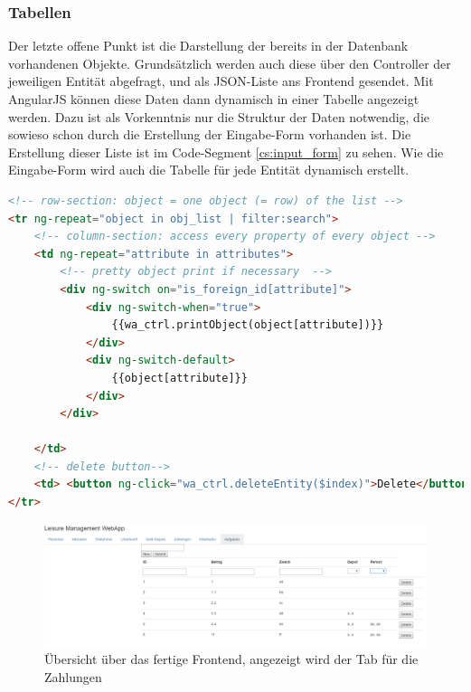 \subsubsection{Tabellen}

Der letzte offene Punkt ist die Darstellung der bereits in der Datenbank vorhandenen Objekte. Grundsätzlich werden auch diese über den Controller der jeweiligen Entität abgefragt, und als JSON-Liste ans Frontend gesendet. Mit AngularJS können diese Daten dann dynamisch in einer Tabelle angezeigt werden. Dazu ist als Vorkenntnis nur die Struktur der Daten notwendig, die sowieso schon durch die Erstellung der Eingabe-Form vorhanden ist. Die Erstellung dieser Liste ist im Code-Segment \ref{cs:input_form} zu sehen. Wie die Eingabe-Form wird auch die Tabelle für jede Entität dynamisch erstellt.

\scriptsize
\begin{lstlisting}[caption=index.html, label=cs:input_form, language=HTML]
<!-- row-section: object = one object (= row) of the list -->
<tr ng-repeat="object in obj_list | filter:search">
	<!-- column-section: access every property of every object -->
	<td ng-repeat="attribute in attributes">
		<!-- pretty object print if necessary  -->
		<div ng-switch on="is_foreign_id[attribute]">
			<div ng-switch-when="true">
				{{wa_ctrl.printObject(object[attribute])}}
			</div>
			<div ng-switch-default>
				{{object[attribute]}}
			</div>
		</div>
	
	</td>
	<!-- delete button-->
	<td> <button ng-click="wa_ctrl.deleteEntity($index)">Delete</button> </td>
</tr>
\end{lstlisting}
\normalsize 

\begin{figure}
\centering
\includegraphics[width=1.4\linewidth, angle=90]{4_frontend/pics/frontend_complete}
\caption{Übersicht über das fertige Frontend, angezeigt wird der Tab für die Zahlungen}
\label{fig:frontend_complete}
\end{figure}


